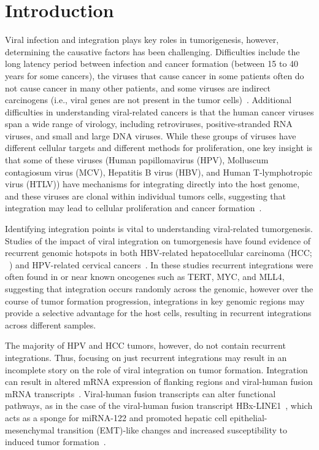 \documentclass[12pt]{article}
\begin{document}
\section{Introduction}
Viral infection and integration plays key roles in tumorigenesis, however, determining the causative factors has been challenging.  Difficulties include the long latency period between infection and cancer formation (between 15 to 40 years for some cancers), the viruses that cause cancer in some patients often do not cause cancer in many other patients, and some viruses are indirect carcinogens (i.e., viral genes are not present in the tumor cells)~\cite{Hausen2009}.  Additional difficulties in understanding viral-related cancers is that the human cancer viruses span a wide range of virology, including retroviruses, positive-stranded RNA viruses, and small and large DNA viruses.  While these groups of viruses have different cellular targets and different methods for proliferation, one key insight is that some of these viruses (Human papillomavirus (HPV), Molluscum contagiosum virus (MCV), Hepatitis B virus (HBV), and Human T-lymphotropic virus (HTLV)) have mechanisms for integrating directly into the host genome, and these viruses are clonal within individual tumors cells, suggesting that integration may lead to cellular proliferation and cancer formation~\cite{Moore2010}.

Identifying integration points is vital to understanding viral-related tumorgenesis.  Studies of the impact of viral integration on tumorgenesis have found evidence of recurrent genomic hotspots in both HBV-related hepatocellular carcinoma (HCC; ~\cite{Ding2012, Khoury2013}) and HPV-related cervical cancers~\cite{Schmitz2012}.  In these studies recurrent integrations were often found in or near known oncogenes such as TERT, MYC, and MLL4, suggesting that integration occurs randomly across the genomic, however over the course of tumor formation progression, integrations in key genomic regions may provide a selective advantage for the host cells, resulting in recurrent integrations across different samples.  

The majority of HPV and HCC tumors, however, do not contain recurrent integrations.  Thus, focusing on just recurrent integrations may result in an incomplete story on the role of viral integration on tumor formation.  Integration can result in altered mRNA expression of flanking regions and viral-human fusion mRNA transcripts~\cite{Tang2013}.  Viral-human fusion transcripts can alter functional pathways, as in the case of the viral-human fusion transcript HBx-LINE1~\cite{Lau2014}, which acts as a sponge for miRNA-122 and promoted hepatic cell epithelial-mesenchymal transition (EMT)-like changes and increased susceptibility to induced tumor formation~\cite{Liang2016}.  
\end{document}
